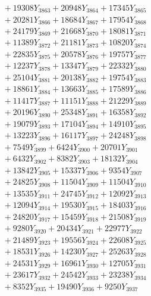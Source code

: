 \documentclass[a4paper,10pt]{article}
\begin{document}
{\begin{align}
&\;  + 19308 Y_{3863} + 20948 Y_{3864} + 17345 Y_{3865} \\[0.3ex]
&\;  + 20281 Y_{3866} + 18684 Y_{3867} + 17954 Y_{3868} \\[0.5ex]\allowbreak
&\;  + 24179 Y_{3869} + 21668 Y_{3870} + 18081 Y_{3871} \\[0.3ex]
&\;  + 11389 Y_{3872} + 21181 Y_{3873} + 10820 Y_{3874} \\[0.3ex]
&\;  + 22835 Y_{3875} + 20578 Y_{3876} + 19757 Y_{3877} \\[0.3ex]
&\;  + 12237 Y_{3878} + 13347 Y_{3879} + 22332 Y_{3880} \\[0.3ex]
&\;  + 25104 Y_{3881} + 20138 Y_{3882} + 19754 Y_{3883} \\[0.3ex]
&\;  + 18861 Y_{3884} + 13663 Y_{3885} + 17589 Y_{3886} \\[0.3ex]
&\;  + 11417 Y_{3887} + 11151 Y_{3888} + 21229 Y_{3889} \\[0.3ex]
&\;  + 20196 Y_{3890} + 25348 Y_{3891} + 16358 Y_{3892} \\[0.3ex]
&\;  + 19079 Y_{3893} + 17104 Y_{3894} + 14910 Y_{3895} \\[0.3ex]
&\;  + 13223 Y_{3896} + 16117 Y_{3897} + 24248 Y_{3898} \\[0.5ex]\allowbreak
&\;  + 7549 Y_{3899} + 6424 Y_{3900} + 20701 Y_{3901} \\[0.3ex]
&\;  + 6432 Y_{3902} + 8382 Y_{3903} + 18132 Y_{3904} \\[0.3ex]
&\;  + 13842 Y_{3905} + 15337 Y_{3906} + 9354 Y_{3907} \\[0.3ex]
&\;  + 24825 Y_{3908} + 11504 Y_{3909} + 11504 Y_{3910} \\[0.3ex]
&\;  + 13535 Y_{3911} + 24745 Y_{3912} + 12092 Y_{3913} \\[0.3ex]
&\;  + 12094 Y_{3914} + 19530 Y_{3915} + 18403 Y_{3916} \\[0.3ex]
&\;  + 24820 Y_{3917} + 15459 Y_{3918} + 21508 Y_{3919} \\[0.3ex]
&\;  + 9280 Y_{3920} + 20434 Y_{3921} + 22977 Y_{3922} \\[0.3ex]
&\;  + 21489 Y_{3923} + 19556 Y_{3924} + 22608 Y_{3925} \\[0.3ex]
&\;  + 18531 Y_{3926} + 14230 Y_{3927} + 25263 Y_{3928} \\[0.5ex]\allowbreak
&\;  + 24531 Y_{3929} + 16961 Y_{3930} + 12705 Y_{3931} \\[0.3ex]
&\;  + 23617 Y_{3932} + 24542 Y_{3933} + 23238 Y_{3934} \\[0.3ex]
&\;  + 8352 Y_{3935} + 19490 Y_{3936} + 9250 Y_{3937} \\[0.3ex]

\end{align}}
\end{document}
